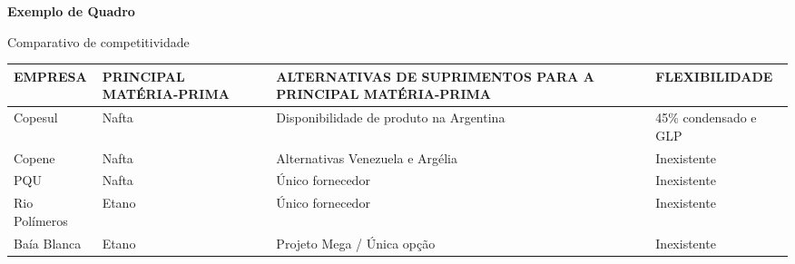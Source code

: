 {\centering\bfseries\color{red}
Exemplo de Quadro
\par}

\begin{quadro}[htb]
\centering
\caption{Comparativo de competitividade}
\begin{supertabular}{|m{2.5cm}|m{2.5cm}|m{6.0cm}|m{3.0cm}|}
\hline
{ EMPRESA } &
{ PRINCIPAL MATÉRIA-PRIMA } &
{ ALTERNATIVAS DE SUPRIMENTOS PARA A PRINCIPAL MATÉRIA-PRIMA } &
{ FLEXIBILIDADE }\\\hline
{ Copesul } &
{ Nafta } &
{ Disponibilidade de produto na Argentina} &
{ 45\% condensado e GLP }\\\hline
{ Copene } &
{ Nafta } &
{ Alternativas Venezuela e Argélia } &
{ Inexistente }\\\hline
{ PQU } &
{ Nafta } &
{ Único fornecedor } &
{ Inexistente }\\\hline
{ Rio Polímeros } &
{ Etano } &
{ Único fornecedor } &
{ Inexistente }\\\hline
{ Baía Blanca } &
{ Etano } &
{ Projeto Mega / Única opção } &
{ Inexistente }\\\hline
\end{supertabular}
    \label{quad:quadro1}
\end{quadro}

\bigskip